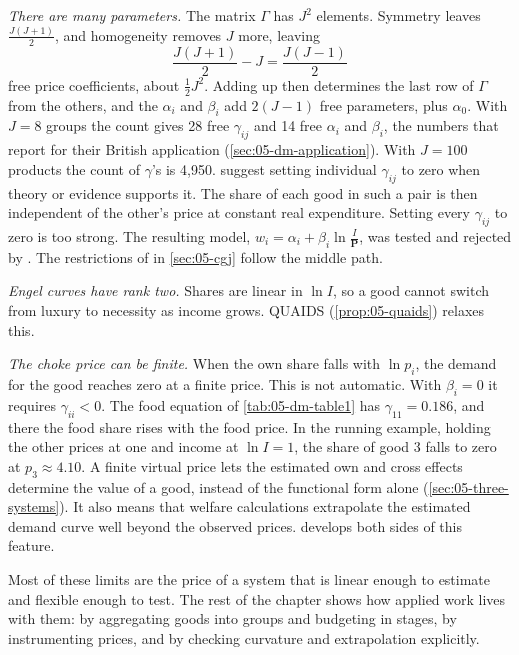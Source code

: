 \emph{There are many parameters.} The matrix $\Gamma$ has $J^2$ elements. Symmetry leaves
$\frac{J(J+1)}{2}$, and homogeneity removes $J$ more, leaving
\begin{equation}\label{eq:05-param-count}
\frac{J(J+1)}{2} - J = \frac{J(J-1)}{2}
\end{equation}
free price coefficients, about $\frac{1}{2}J^2$. Adding up then determines the last row of $\Gamma$ from the
others, and the $\alpha_i$ and $\beta_i$ add $2(J - 1)$ free parameters, plus $\alpha_0$. With $J = 8$
groups the count gives 28 free $\gamma_{ij}$ and 14 free $\alpha_i$ and $\beta_i$, the numbers that
\citet[p.~318]{DeatonMuellbauer1980a} report for their British application (\cref{sec:05-dm-application}).
With $J = 100$ products the count of $\gamma$'s is 4{,}950. \citet[p.~315]{DeatonMuellbauer1980a} suggest
setting individual $\gamma_{ij}$ to zero when theory or evidence supports it. The share of each good in such a
pair is then independent of the other's price at constant real expenditure. Setting every $\gamma_{ij}$
to zero is too strong. The resulting model, $w_i = \alpha_i + \beta_i\ln\frac{I}{\mathbf{P}}$, was tested and
rejected by \citet{Deaton1978}. The restrictions of \citet{ChaudhuriGoldbergJia2006} in \cref{sec:05-cgj}
follow the middle path.

\emph{Engel curves have rank two.} Shares are linear in $\ln I$, so a good cannot switch from luxury to
necessity as income grows. QUAIDS (\cref{prop:05-quaids}) relaxes this.

\emph{The choke price can be finite.} When the own share falls with $\ln p_i$, the demand for the good reaches
zero at a finite price. This is not automatic. With $\beta_i = 0$ it requires $\gamma_{ii} < 0$. The food
equation of \cref{tab:05-dm-table1} has $\gamma_{11} = 0.186$, and there the food share rises with the food
price. In the running example, holding the other prices at one and income at $\ln I = 1$,
the share of good 3 falls to zero at $p_3 \approx 4.10$. A finite virtual price lets the estimated own and
cross effects determine the value of a good, instead of the functional form alone (\cref{sec:05-three-systems}). It also means that
welfare calculations extrapolate the estimated demand curve well beyond the observed prices.
 develops both sides of this feature.

Most of these limits are the price of a system that is linear enough to estimate and flexible enough to
test. The rest of the chapter shows how applied work lives with them: by aggregating goods into groups and
budgeting in stages, by instrumenting prices, and by checking curvature and extrapolation explicitly.
